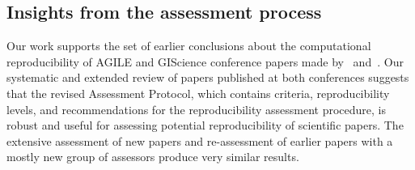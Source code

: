 \documentclass{josis}
\begin{document}
\subsection{Insights from the assessment process}

Our work supports the set of earlier conclusions about the computational reproducibility of AGILE and GIScience conference papers made by~\cite{nust2018} and~\cite{ostermann2021}. 
Our systematic and extended review of papers published at both conferences suggests that the revised Assessment Protocol, which contains criteria, reproducibility levels, and recommendations for the reproducibility assessment procedure, is robust and useful for assessing potential reproducibility of scientific papers.
The extensive assessment of new papers and re-assessment of earlier papers with a mostly new group of assessors produce very similar results.

\end{document}
